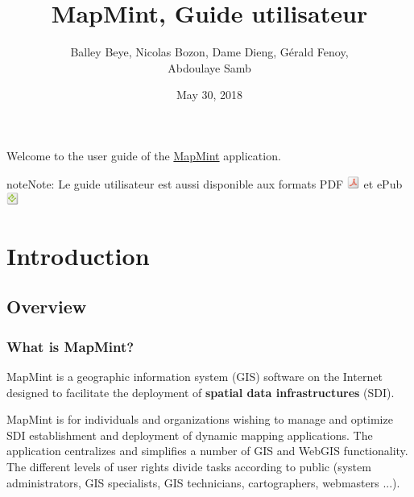 \documentclass[letterpaper,10pt,english]{sphinxmanual}
\title{MapMint, Guide utilisateur}
\date{May 30, 2018}
\author{Balley Beye, Nicolas Bozon, Dame Dieng, Gérald Fenoy, \\Abdoulaye Samb}
\begin{document}
\maketitle
\tableofcontents
{}\label{index::doc}


Welcome to the user guide of the \href{http://mapmint.com}{MapMint} application.

\begin{notice}{note}{Note:}
Le guide utilisateur est aussi disponible aux formats
PDF \includegraphics{pdf.png}  et ePub \includegraphics{epub.png}
\end{notice}


\chapter{Introduction}
\label{introduction/index:table-des-matieres}\label{introduction/index:home}\label{introduction/index::doc}\label{introduction/index:dashboard}\label{introduction/index:introduction}

\section{Overview}
\label{introduction/introduction:generalites}\label{introduction/introduction::doc}\label{introduction/introduction:userguidegeneral}

\subsection{What is MapMint?}
\label{introduction/introduction:quest-ce-que-mapmint}
MapMint is a geographic information system (GIS) software on the Internet designed to facilitate the deployment of  \textbf{spatial data infrastructures} (SDI).

MapMint is for individuals and organizations wishing to manage and optimize SDI establishment and deployment of dynamic mapping applications. The application centralizes and simplifies a number of GIS and WebGIS functionality. The different levels of user rights divide tasks according to public (system administrators, GIS specialists, GIS technicians, cartographers, webmasters ...).
\end{document}
